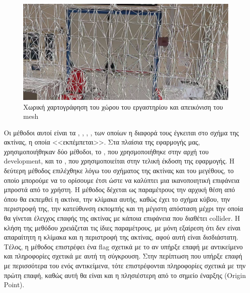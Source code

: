 \begin{figure}[!h]
    \centering
    \includegraphics[width=1\textwidth]{images/develop_spatialMappingLab.png}
    \caption{Χωρική χαρτογράφηση του χώρου του εργαστηρίου και απεικόνιση του mesh}\label{fig:developSpatialMappingLab}
\end{figure}

Οι μέθοδοι αυτοί είναι τα , , , , των οποίων η διαφορά τους έγκειται στο σχήμα της ακτίνας, η οποία <<εκπέμπεται>>. Στα πλαίσια της εφαρμογής μας, χρησιμοποιήθηκαν δύο μέθοδοι, το , που χρησμοποιήθηκε στην αρχή του development, και το , που χρησιμοποιείται στην τελική έκδοση της εφαρμογής. Η δεύτερη μέθοδος επιλέχθηκε λόγω του σχήματος της ακτίνας και του μεγέθους, το οποίο μπορούμε να το ορίσουμε έτσι ώστε να καλύπτει μια ικανοποιητική επιφάνεια μπροστά από το χρήστη. Η μέθοδος δέχεται ως παραμέτρους την αρχική θέση από όπου θα εκπεμθεί η ακτίνα, την κλίμακα αυτής, καθώς έχει το σχήμα κύβου, την περιστροφή της, την κατεύθυνση εκπομπής και τη μέγιστη απόσταση μέχρι την οποία θα γίνεται έλεγχος επαφής της ακτίνας με κάποια επιφάνεια που διαθέτει collider. Η κλήση της μεθόδου  χρειάζεται τις ίδιες παραμέτρους, με μόνη εξαίρεση ότι δεν είναι απαραίτητη η κλίμακα και η περιστροφή της ακτίνας, αφού αυτή είναι δισδιάστατη. Τέλος, η μέθοδος επιστρέφει ένα flag σχετικά με το αν υπήρξε επαφή με αντικείμενο και πληροφορίες σχετικά με αυτή τη σύγκρουση. Στην περίπτωση που υπήρξε επαφή με περισσότερα του ενός αντικείμενα, τότε επιστρέφονται πληροφορίες σχετικά με την πρώτη επαφή, καθώς αυτή θα είναι και η πλησιέστερη από το σημείο έναρξης (Origin Point).

